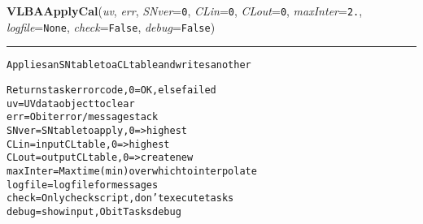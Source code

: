     \begin{boxedminipage}{\textwidth}

    \raggedright \textbf{VLBAApplyCal}(\textit{uv}, \textit{err}, \textit{SNver}=\texttt{0\-}, \textit{CLin}=\texttt{0\-}, \textit{CLout}=\texttt{0\-}, \textit{maxInter}=\texttt{2\-.\-}, \textit{logfile}=\texttt{N\-o\-n\-e\-}, \textit{check}=\texttt{F\-a\-l\-s\-e\-}, \textit{debug}=\texttt{F\-a\-l\-s\-e\-})

    \vspace{-1.5ex}

    \rule{\textwidth}{0.5\fboxrule}
\begin{alltt}
Applies an SN table to a CL table and writes another

Returns task error code, 0=OK, else failed
uv       = UV data object to clear
err      = Obit error/message stack
SNver    = SN table to apply, 0={\textgreater}highest
CLin     = input CL table, 0={\textgreater}highest
CLout    = output CL table, 0={\textgreater}create new
maxInter = Max time (min) over which to interpolate
logfile  = logfile for messages
check    = Only check script, don't execute tasks
debug    = show input, ObitTasks debug\end{alltt}

    \vspace{1ex}

    \end{boxedminipage}

    \label{VLBACal:VLBAAutoFlag}
    \vspace{0.5ex}

